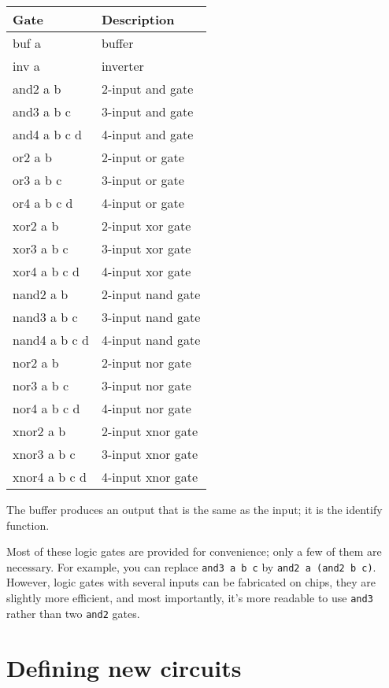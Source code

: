 \documentclass[11pt]{article}
\begin{document}
\begin{center}
\begin{tabular}{ll}
Gate & Description\\[0pt]
\hline
buf a & buffer\\[0pt]
inv a & inverter\\[0pt]
and2 a b & 2-input and gate\\[0pt]
and3 a b c & 3-input and gate\\[0pt]
and4 a b c d & 4-input and gate\\[0pt]
or2 a b & 2-input or gate\\[0pt]
or3 a b c & 3-input or gate\\[0pt]
or4 a b c d & 4-input or gate\\[0pt]
xor2 a b & 2-input xor gate\\[0pt]
xor3 a b c & 3-input xor gate\\[0pt]
xor4 a b c d & 4-input xor gate\\[0pt]
nand2 a b & 2-input nand gate\\[0pt]
nand3 a b c & 3-input nand gate\\[0pt]
nand4 a b c d & 4-input nand gate\\[0pt]
nor2 a b & 2-input nor gate\\[0pt]
nor3 a b c & 3-input nor gate\\[0pt]
nor4 a b c d & 4-input nor gate\\[0pt]
xnor2 a b & 2-input xnor gate\\[0pt]
xnor3 a b c & 3-input xnor gate\\[0pt]
xnor4 a b c d & 4-input xnor gate\\[0pt]
\end{tabular}
\end{center}

The buffer produces an output that is the same as the input; it is the
identify function.

Most of these logic gates are provided for convenience; only a few of
them are necessary.  For example, you can replace \texttt{and3 a b c} by
\texttt{and2 a (and2 b c)}.  However, logic gates with several inputs can be
fabricated on chips, they are slightly more efficient, and most
importantly, it's more readable to use \texttt{and3} rather than two \texttt{and2}
gates.

\section{Defining new circuits}
\label{sec:org8e73bd4}
\end{document}
